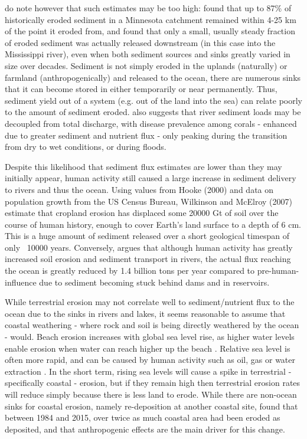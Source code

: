 \documentclass[11pt,a4paper]{article}
\begin{document}
\cite{WilkinsonMcElroy2007} do note however that such estimates may be too high: \cite{Beach1994} found that up to 87\% of historically eroded sediment in a Minnesota catchment remained within 4-25 km of the point it eroded from, and \cite{Trimble1999} found that only a small, usually steady fraction of eroded sediment was actually released downstream (in this case into the Mississippi river), even when both sediment sources and sinks greatly varied in size over decades. Sediment is not simply eroded in the uplands (naturally) or farmland (anthropogenically) and released to the ocean, there are numerous sinks that it can become stored in either temporarily or near permanently. Thus, sediment yield out of a system (e.g. out of the land into the sea) can relate poorly to the amount of sediment eroded.  \cite{Thompson2014} also suggests that river sediment loads may be decoupled from total discharge, with disease prevalence among corals - enhanced due to greater sediment and nutrient flux - only peaking during the transition from dry to wet conditions, or during floods.


Despite this likelihood that sediment flux estimates are lower than they may initially appear, human activity still caused a large increase in sediment delivery to rivers and thus the ocean. Using values from Hooke (2000) and data on population growth from the US Census Bureau, Wilkinson and McElroy (2007) estimate that cropland erosion has displaced some 20000 Gt of soil over the course of human history, enough to cover Earth's land surface to a depth of 6 cm. This is a huge amount of sediment released over a short geological timespan of only ~10000 years. Conversely, \cite{Syvitski2005} argues that although human activity has greatly increased soil erosion and sediment transport in rivers, the actual flux reaching the ocean is greatly reduced by 1.4 billion tons per year compared to pre-human-influence due to sediment becoming stuck behind dams and in reservoirs. 

While terrestrial erosion may not correlate well to sediment/nutrient flux to the ocean due to the sinks in rivers and lakes, it seems reasonable to assume that coastal weathering - where rock and soil is being directly weathered by the ocean - would. Beach erosion increases with global sea level rise, as higher water levels enable erosion when water can reach higher up the beach \citep{Zhang2004}. Relative sea level is often more rapid, and can be caused by human activity such as oil, gas or water extraction \citep{Williams2018}. 
In the short term, rising sea levels will cause a spike in terrestrial - specifically coastal - erosion, but if they remain high then terrestrial erosion rates will reduce simply because there is less land to erode. While there are non-ocean sinks for coastal erosion, namely re-deposition at another coastal site, \cite{Mentaschi2018} found that between 1984 and 2015, over twice as much coastal area had been eroded as deposited, and that anthropogenic effects are the main driver for this change.
\end{document}
